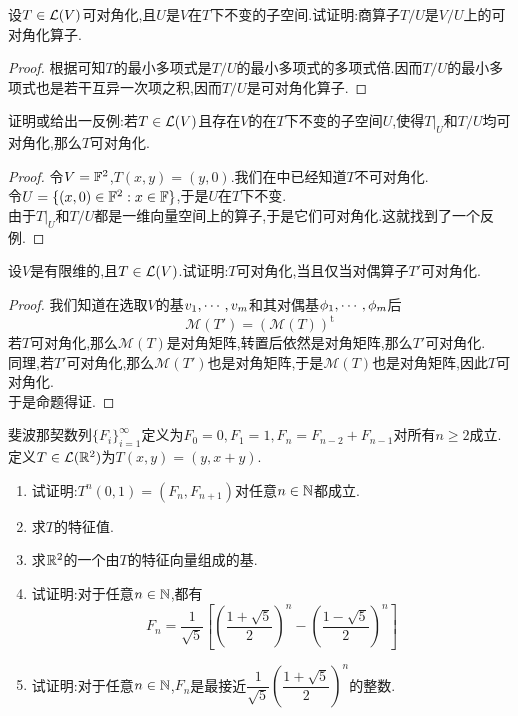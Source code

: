 \documentclass{ctexart}
\begin{document}
\begin{problem}[18.]
    设$T\in\mathcal{L}(V)$可对角化,且$U$是$V$在$T$下不变的子空间.试证明:商算子$T/U$是$V/U$上的可对角化算子.
\end{problem}
\begin{proof}
    根据可知$T$的最小多项式是$T/U$的最小多项式的多项式倍.因而$T/U$的最小多项式也是若干互异一次项之积,因而$T/U$是可对角化算子.
\end{proof}
\begin{problem}[19.]
    证明或给出一反例:若$T\in\mathcal{L}(V)$且存在$V$的在$T$下不变的子空间$U$,使得$T|_U$和$T/U$均可对角化,那么$T$可对角化.
\end{problem}
\begin{proof}
    令$V=\mathbb{F}^2$,$T(x,y)=(y,0)$.我们在中已经知道$T$不可对角化.\\
    令$U=\{(x,0)\in\mathbb{F}^2:x\in\mathbb{F}\}$,于是$U$在$T$下不变.\\
    由于$T|_U$和$T/U$都是一维向量空间上的算子,于是它们可对角化.这就找到了一个反例.
\end{proof}
\begin{problem}[20.]
    设$V$是有限维的,且$T\in\mathcal{L}(V)$.试证明:$T$可对角化,当且仅当对偶算子$T'$可对角化.
\end{problem}
\begin{proof}
    我们知道在选取$V$的基${v}_1,\cdots,{v}_{m}$和其对偶基${\phi}_1,\cdots,{\phi}_{m}$后
    \[\mathcal{M}(T')=\left(\mathcal{M}(T)\right)^{\text{t}}\]
    若$T$可对角化,那么$\mathcal{M}(T)$是对角矩阵,转置后依然是对角矩阵,那么$T'$可对角化.\\
    同理,若$T'$可对角化,那么$\mathcal{M}(T')$也是对角矩阵,于是$\mathcal{M}(T)$也是对角矩阵,因此$T$可对角化.\\
    于是命题得证.
\end{proof}
\begin{problem}[21.]
    斐波那契数列$\{F_i\}_{i=1}^{\infty}$定义为$F_0=0,F_1=1,F_n=F_{n-2}+F_{n-1}$对所有$n\geqslant 2$成立.\\定义$T\in\mathcal{L}(\mathbb{R}^2)$为$T(x,y)=(y,x+y)$.
    \begin{enumerate}[label=\tbf{(\arabic*)}]
        \item 试证明:$T^{n}(0,1)=(F_n,F_{n+1})$对任意$n\in\mathbb{N}$都成立.
        \item 求$T$的特征值.
        \item 求$\mathbb{R}^2$的一个由$T$的特征向量组成的基.
        \item 试证明:对于任意$n\in\mathbb{N}$,都有
            \[F_n=\dfrac{1}{\sqrt{5}}\left[\left(\dfrac{1+\sqrt5}{2}\right)^n-\left(\dfrac{1-\sqrt5}{2}\right)^n\right]\]
        \item 试证明:对于任意$n\in\mathbb{N}$,$F_n$是最接近$\dfrac{1}{\sqrt5}\left(\dfrac{1+\sqrt5}{2}\right)^n$的整数.
    \end{enumerate}
\end{problem}
\end{document}
